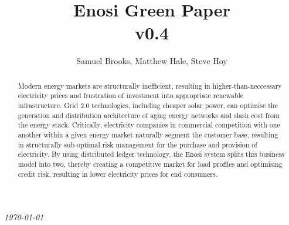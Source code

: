 \documentclass{article}
\theoremstyle{definition}
\theoremstyle{plain} %
\begin{document}

\title{Enosi Green Paper\\ v0.4}
\author{Samuel Brooks, Matthew Hale, Steve Hoy}
\date{}

\maketitle

\hfill

\begin{abstract}
\noindent Modern energy markets are structurally inefficient, resulting in higher-than-neccessary electricity prices and frustration of investment into appropriate renewable infrastructure.
Grid 2.0 technologies, including cheaper solar power, can optimise the generation and distribution architecture of aging energy networks and slash cost from the energy stack.
Critically, electricity companies in commercial competition with one another within a given energy market naturally segment the customer base, resulting in structurally sub-optimal risk management for the purchase and provision of electricity. By using distributed ledger technology, the Enosi system splits this business model into two, thereby creating a competitive market for load profiles and optimising credit risk, resulting in lower electricity prices for end consumers.
\end{abstract}
\vspace{20mm}
\begin{center}
  \small{\textit{\today}}
\end{center}


\pagebreak

\tableofcontents


\pagebreak

%
%
%



%
%

%
%
\end{document}
